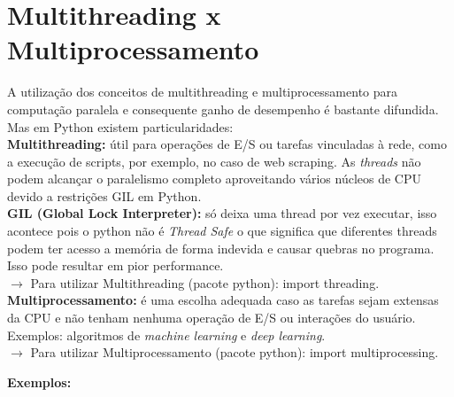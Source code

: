 \documentclass{beamer}
\begin{document}
	\section{Multithreading x Multiprocessamento}
	A utilização dos conceitos de multithreading e multiprocessamento para computação paralela e consequente ganho de desempenho é bastante difundida. Mas em Python existem particularidades: \\ 
	\textbf{Multithreading:} útil para operações de E/S ou tarefas vinculadas à rede, como a execução de scripts, por exemplo, no caso de web scraping. As \textit{threads} não podem alcançar o paralelismo completo aproveitando vários núcleos de CPU devido a restrições GIL em Python. \\
 	\textbf{GIL (Global Lock Interpreter):} só deixa uma thread por vez executar, isso acontece pois o python não é \textit{Thread Safe} o que significa que diferentes threads podem ter acesso a memória de forma indevida e causar quebras no programa. Isso pode resultar em pior performance. \\
	$\rightarrow$ Para utilizar Multithreading (pacote python): import threading. \\
 	\textbf{Multiprocessamento:} é uma escolha adequada caso as tarefas sejam extensas da CPU e não tenham nenhuma operação de E/S ou interações do usuário. Exemplos: algoritmos de \textit{machine learning} e \textit{deep learning}. \\
	$\rightarrow$ Para utilizar Multiprocessamento (pacote python): import multiprocessing. \\
	\newpage

	\alert{\textbf{Exemplos:}} \\
\end{document}
